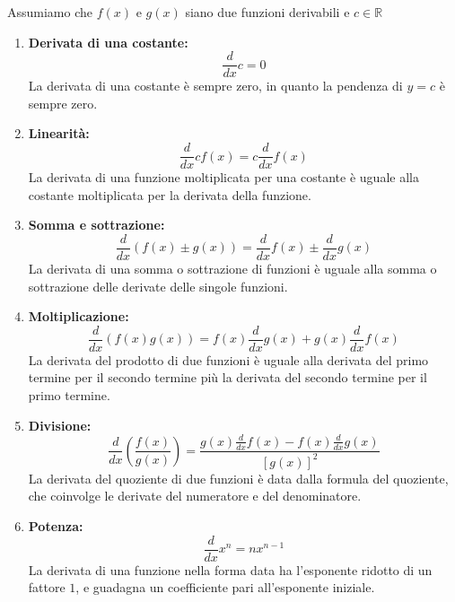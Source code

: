 \documentclass{article}
\begin{document}
Assumiamo che \(f(x)\) e \(g(x)\) siano due funzioni derivabili e \(c\in\mathbb{R}\)
\begin{enumerate}
    \item \textbf{Derivata di una costante:}
    \begin{equation*}
        \frac{d}{dx} c = 0
    \end{equation*}
    La derivata di una costante è sempre zero, in quanto la pendenza di \(y=c\) è sempre zero.
    
    \item \textbf{Linearità:}
    \begin{equation*}
        \frac{d}{dx} cf(x) = c \frac{d}{dx} f(x)
    \end{equation*}
    La derivata di una funzione moltiplicata per una costante è uguale alla costante moltiplicata per la derivata della funzione.
    
    \item \textbf{Somma e sottrazione:}
    \begin{equation*}
        \frac{d}{dx} \left(f(x) \pm g(x)\right) = \frac{d}{dx} f(x) \pm \frac{d}{dx} g(x)
    \end{equation*}
    La derivata di una somma o sottrazione di funzioni è uguale alla somma o sottrazione delle derivate delle singole funzioni.
    
    \item \textbf{Moltiplicazione:}
    \begin{equation*}
        \frac{d}{dx} \left(f(x) g(x)\right) = f(x) \frac{d}{dx} g(x) + g(x) \frac{d}{dx} f(x)
    \end{equation*}
    La derivata del prodotto di due funzioni è uguale alla derivata del primo termine per il secondo termine più la derivata del secondo termine per il primo termine.
    
    \item \textbf{Divisione:}
    \begin{equation*}
        \frac{d}{dx} \left( \frac{f(x)}{g(x)} \right) = \frac{g(x) \frac{d}{dx} f(x) - f(x) \frac{d}{dx} g(x)}{[g(x)]^2}
    \end{equation*}
    La derivata del quoziente di due funzioni è data dalla formula del quoziente, che coinvolge le derivate del numeratore e del denominatore.
    
    \item \textbf{Potenza:}
    \begin{equation*}
        \frac{d}{dx} x^n = n x^{n-1}
    \end{equation*}
    La derivata di una funzione nella forma data ha l'esponente ridotto di un fattore \(1\), e guadagna
    un coefficiente pari all'esponente iniziale.
    

\end{enumerate}
\end{document}
